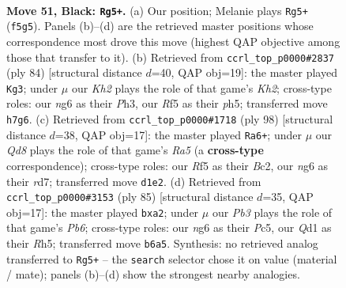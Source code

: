 \documentclass[11pt]{article}
\begin{document}
\clearpage

\begin{figure}[p]\centering
\begin{subfigure}{0.46\textwidth}\centering
\resizebox{\linewidth}{!}{%
\newchessgame
\chessboard[
  setfen={8/2r3pk/1p4N1/P4r2/3pp3/R7/5PK1/3q4 b - - 0 51},
  showmover=false,
  pgfstyle=straightmove, color=movearrow, markmove={f5-g5}
]}
\caption{}
\end{subfigure}\hfill
\begin{subfigure}{0.46\textwidth}\centering
\resizebox{\linewidth}{!}{%
\newchessgame
\chessboard[
  setfen={8/k7/p7/P2p3p/2P1p3/7P/4R1PK/3r4 w - - 0 43},
  showmover=false,
  pgfstyle=straightmove, color=movearrow, markmove={h2-g3}
]}
\caption{}
\end{subfigure}
\\[4pt]
\begin{subfigure}{0.46\textwidth}\centering
\resizebox{\linewidth}{!}{%
\newchessgame
\chessboard[
  setfen={b7/P2r4/5k2/R3p3/5pp1/6P1/2B2P2/4K3 w - - 0 50},
  showmover=false,
  pgfstyle=straightmove, color=movearrow, markmove={a5-a6}
]}
\caption{}
\end{subfigure}\hfill
\begin{subfigure}{0.46\textwidth}\centering
\resizebox{\linewidth}{!}{%
\newchessgame
\chessboard[
  setfen={8/4k2p/R7/2p2p1r/2P2K2/1p5P/P4P2/8 b - - 2 43},
  showmover=false,
  pgfstyle=straightmove, color=movearrow, markmove={b3-a2}
]}
\caption{}
\end{subfigure}
\caption{\textbf{Move 51, Black: \texttt{Rg5+}.} (a) Our position; Melanie plays \texttt{Rg5+} (\texttt{f5g5}). Panels (b)--(d) are the retrieved master positions whose correspondence most drove this move (highest QAP objective among those that transfer to it). (b) Retrieved from \texttt{ccrl\_top\_p0000\#2837} (ply 84) [structural distance $d$=40, QAP obj=19]: the master played \texttt{Kg3}; under $\mu$ our \emph{Kh2} plays the role of that game's \emph{Kh2}; cross-type roles: our \emph{n}g6 as their \emph{P}h3, our \emph{R}f5 as their \emph{p}h5; transferred move \texttt{h7g6}. (c) Retrieved from \texttt{ccrl\_top\_p0000\#1718} (ply 98) [structural distance $d$=38, QAP obj=17]: the master played \texttt{Ra6+}; under $\mu$ our \emph{Qd8} plays the role of that game's \emph{Ra5} (a \textbf{cross-type} correspondence); cross-type roles: our \emph{R}f5 as their \emph{B}c2, our \emph{n}g6 as their \emph{r}d7; transferred move \texttt{d1e2}. (d) Retrieved from \texttt{ccrl\_top\_p0000\#3153} (ply 85) [structural distance $d$=35, QAP obj=17]: the master played \texttt{bxa2}; under $\mu$ our \emph{Pb3} plays the role of that game's \emph{Pb6}; cross-type roles: our \emph{n}g6 as their \emph{P}c5, our \emph{Q}d1 as their \emph{R}h5; transferred move \texttt{b6a5}. Synthesis: no retrieved analog transferred to \texttt{Rg5+} -- the \texttt{search} selector chose it on value (material / mate); panels (b)--(d) show the strongest nearby analogies.}
\label{fig:thought-m101}
\end{figure}
\end{document}
